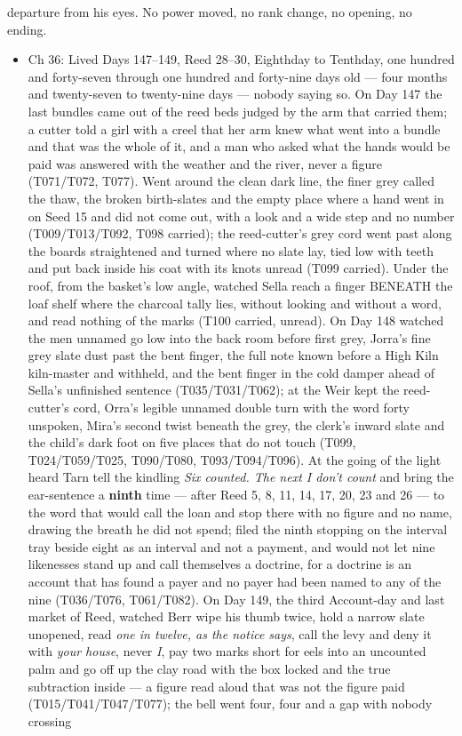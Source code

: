 \documentclass{design/chronicle}
\begin{document}
{\begin{itemize}[leftmargin=1.4em,itemsep=1pt,topsep=3pt,parsep=0pt]
departure from his eyes. No power moved, no rank change, no opening, no ending.

\end{itemize}

\begin{itemize}[leftmargin=1.4em,itemsep=1pt,topsep=3pt,parsep=0pt]

\item Ch 36: Lived Days 147–149, Reed 28–30, Eighthday to Tenthday, one hundred and forty-seven through one hundred and forty-nine days old — four months and twenty-seven to twenty-nine days — nobody saying so. On Day 147 the last bundles came out of the reed beds judged by the arm that carried them; a cutter told a girl with a creel that her arm knew what went into a bundle and that was the whole of it, and a man who asked what the hands would be paid was answered with the weather and the river, never a figure (T071/T072, T077). Went around the clean dark line, the finer grey called the thaw, the broken birth-slates and the empty place where a hand went in on Seed 15 and did not come out, with a look and a wide step and no number (T009/T013/T092, T098 carried); the reed-cutter’s grey cord went past along the boards straightened and turned where no slate lay, tied low with teeth and put back inside his coat with its knots unread (T099 carried). Under the roof, from the basket’s low angle, watched Sella reach a finger BENEATH the loaf shelf where the charcoal tally lies, without looking and without a word, and read nothing of the marks (T100 carried, unread). On Day 148 watched the men unnamed go low into the back room before first grey, Jorra’s fine grey slate dust past the bent finger, the full note known before a High Kiln kiln-master and withheld, and the bent finger in the cold damper ahead of Sella’s unfinished sentence (T035/T031/T062); at the Weir kept the reed-cutter’s cord, Orra’s legible unnamed double turn with the word forty unspoken, Mira’s second twist beneath the grey, the clerk’s inward slate and the child’s dark foot on five places that do not touch (T099, T024/T059/T025, T090/T080, T093/T094/T096). At the going of the light heard Tarn tell the kindling \emph{Six counted. The next I don’t count} and bring the ear-sentence a \textbf{ninth} time — after Reed 5, 8, 11, 14, 17, 20, 23 and 26 — to the word that would call the loan and stop there with no figure and no name, drawing the breath he did not spend; filed the ninth stopping on the interval tray beside eight as an interval and not a payment, and would not let nine likenesses stand up and call themselves a doctrine, for a doctrine is an account that has found a payer and no payer had been named to any of the nine (T036/T076, T061/T082). On Day 149, the third Account-day and last market of Reed, watched Berr wipe his thumb twice, hold a narrow slate unopened, read \emph{one in twelve, as the notice says}, call the levy and deny it with \emph{your house}, never \emph{I}, pay two marks short for eels into an uncounted palm and go off up the clay road with the box locked and the true subtraction inside — a figure read aloud that was not the figure paid (T015/T041/T047/T077); the bell went four, four and a gap with nobody crossing 
\end{itemize}}
\end{document}
